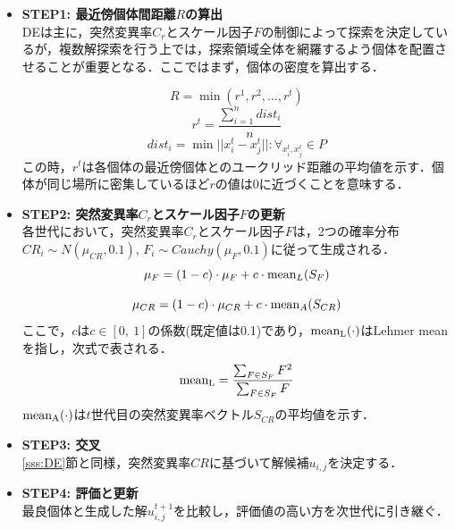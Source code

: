 \documentclass[a4j,11pt]{jarticle}
\begin{document}
\begin{itemize}
\item {\bf STEP1: 最近傍個体間距離$R$の算出} \\
DEは主に，突然変異率$C_r$とスケール因子$F$の制御によって探索を決定しているが，複数解探索を行う上では，探索領域全体を網羅するよう個体を配置させることが重要となる．ここではまず，個体の密度を算出する．

\begin{equation}
\label{eq:dADE-rmin}
R=\min{(r^1, r^2, ...,r^t)}
\end{equation}
\begin{equation}
\label{eq:dADE-r}
r^t=\frac{\sum_{i=1}^n dist_i}{n}
\end{equation}
\begin{equation}
\label{eq:dADE-dist}
dist_i=\min{||x_i^t-x_j^t||:\forall_{x_i^t, x_j^t} \in P}
\end{equation}
この時，$r^t$は各個体の最近傍個体とのユークリッド距離の平均値を示す．個体が同じ場所に密集しているほど$r$の値は0に近づくことを意味する．

\item {\bf STEP2: 突然変異率$C_r$とスケール因子$F$の更新} \\
各世代において，突然変異率$C_r$とスケール因子$F$は，2つの確率分布$CR_i \sim N(\mu_{CR},0.1)$, $F_i \sim Cauchy(\mu_F, 0.1)$に従って生成される．
\begin{equation}
\label{eq:dADE-f}
\mu_F = (1-c) \cdot \mu_F + c \cdot {\rm mean}_L(S_F)
\end{equation}

\begin{equation}
\label{eq:dADE-cr}
\mu_{CR} = (1-c) \cdot \mu_{CR} + c \cdot {\rm mean}_A(S_{CR})
\end{equation}
ここで，$c$は$c \in [0, \ 1]$の係数(既定値は0.1)であり，${\rm mean_L}(\cdot)$はLehmer mean \cite{Lehmer} を指し，次式で表される．
\begin{equation}
{\rm mean_L}=\frac{\sum_{F \in S_F}F^2}{\sum_{F \in S_F}F}
\end{equation}
 ${\rm mean_A}(\cdot)$は$t$世代目の突然変異率ベクトル$S_{CR}$の平均値を示す．

\item {\bf STEP3: 交叉} \\
\ref{sss:DE}節と同様，突然変異率$CR$に基づいて解候補$u_{i,j}$を決定する．

\item {\bf STEP4: 評価と更新} \\
最良個体と生成した解$u_{i,j}^{t+1}$を比較し，評価値の高い方を次世代に引き継ぐ．


\end{itemize}
\end{document}
